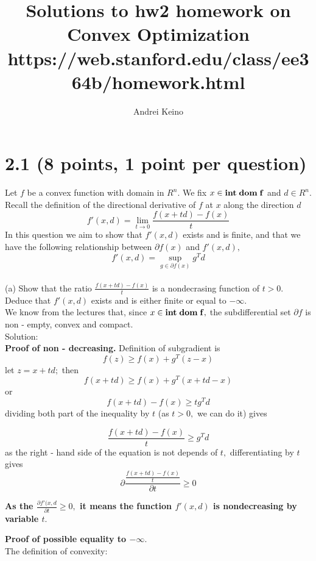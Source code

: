 \documentclass{article}
\begin{document}
\title{Solutions to hw2 homework on Convex Optimization https://web.stanford.edu/class/ee364b/homework.html}
\author{Andrei Keino}
\maketitle

\section*{2.1 (8 points, 1 point per question)} 
Let $f$ be a convex function with domain in $R^n.$ 
We fix $x \in \bf{int \; dom}\; f  $ and $d \in R^n.$
Recall the definition of the directional derivative of $f$
at $x$ along the direction $d$
$$
f'(x, d) = \lim_{t \rightarrow 0} \frac{f(x + td) - f(x)}{t}
$$
In this question we aim to show that $f'(x, d)$ exists and is finite, and that we have the following relationship 
between $\partial f(x)$  and $f'(x, d),$
$$
f'(x, d) = \sup_{g \in \partial f(x)} g^T d
$$
\\

(a) Show that the ratio $\frac{f(x + td) - f(x)}{t}$ is a nondecrasing function of $t > 0.$ Deduce that $f'(x, d)$
exists and is either finite or equal to $- \infty.$ \\
We know from the lectures that, since $x \in \bf{int \; dom \;} f,$ the subdifferential set $\partial f$ is non - empty, convex and compact.
\\

Solution:\\

\textbf{Proof of non - decreasing.}
Definition of subgradient is
$$
f(z) \geq f(x) + g^T(z - x)
$$
let $z = x + td;$ then
$$
f(x + td) \geq f(x) + g^T(x + td - x)
$$
or 
$$
f(x + td) - f(x) \geq t g^T d
$$
dividing both part of the inequality by $t$ (as $t > 0,$
we can do it) gives

$$
\frac{f(x + td) - f(x)}{t} \geq g^T d
$$
as the right - hand side of the equation is not depends of $t,$ differentiating by $t$  gives
$$
\partial \frac {\frac{f(x + td) - f(x)}{t}} {\partial t} \geq 0
$$


\textbf{As the $\frac{\partial f'(x, d}{\partial t} \geq 0,$ it means the function $f'(x, d)$ is nondecreasing by variable $t.$ }

\textbf{Proof of possible equality to $- \infty.$}\\
The definition of convexity: \\
\end{document}
